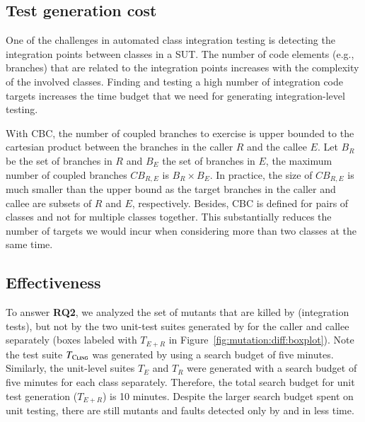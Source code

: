 
\subsection{Test generation cost}

One of the challenges in automated class integration testing is detecting the integration points between classes in a SUT. The number of code elements (e.g., branches) that are related to the integration points increases with the complexity of the involved classes. Finding and testing a high number of integration code targets increases the time budget that we need for generating integration-level testing. 

With CBC, the number of coupled branches to exercise is upper bounded to the cartesian product between the branches in the caller $R$ and the callee $E$. Let $B_R$ be the set of branches in $R$ and $B_E$ the set of branches in $E$, the maximum number of coupled branches $CB_{R,E}$ is $B_R \times B_E$. In practice, the size of $CB_{R,E}$ is much smaller than the upper bound as the target branches in the caller and callee are subsets of $R$ and $E$, respectively. Besides, CBC is defined for pairs of classes and not for multiple classes together. This substantially reduces the number of targets we would incur when considering more than two classes at the same time.


\subsection{Effectiveness}

To answer \textbf{RQ2}, we analyzed the set of mutants that are killed by \cling (integration tests), but not by the two unit-test suites generated by \evosuite for the caller and callee separately (boxes labeled with $T_{E+R}$ in Figure~\ref{fig:mutation:diff:boxplot}). Note the test suite $T_\textsc{Cling}$ was generated by \cling using a search budget of five minutes. Similarly, the unit-level suites $T_{E}$ and $T_{R}$ were generated with a search budget of five minutes for each class separately. Therefore, the total search budget for unit test generation ($T_{E+R}$) is 10 minutes. Despite the larger search budget spent on unit testing, there are still mutants and faults detected only by \cling and in less time.


